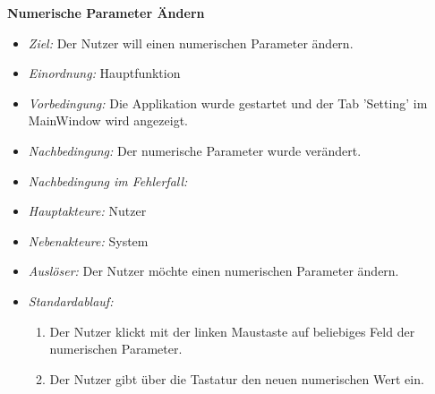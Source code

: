 \textbf{Numerische Parameter \"Andern}
  \begin{itemize}
  \item \textit{Ziel:} Der Nutzer will einen  numerischen Parameter \"andern.
  \item \textit{Einordnung:} Hauptfunktion
  \item \textit{Vorbedingung:} Die Applikation wurde gestartet und der Tab 'Setting' im MainWindow wird angezeigt.
  \item \textit{Nachbedingung:} Der numerische Parameter wurde ver\"andert.
  \item \textit{Nachbedingung im Fehlerfall:} 
  \item \textit{Hauptakteure:} Nutzer
  \item \textit{Nebenakteure:} System
  \item \textit{Ausl\"oser:} Der Nutzer m\"ochte einen  numerischen Parameter \"andern.
  \item \textit{Standardablauf:}
    \begin{enumerate}
    \item Der Nutzer klickt mit der linken Maustaste auf beliebiges Feld der numerischen Parameter. 
    \item Der Nutzer gibt \"uber die Tastatur den neuen numerischen Wert ein.
  \end{enumerate}
  \end{itemize}